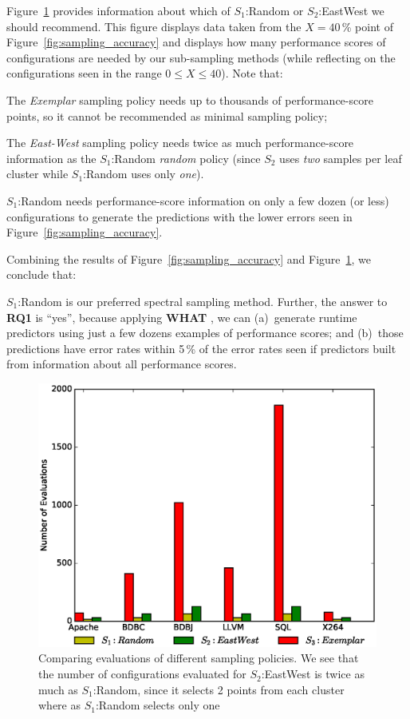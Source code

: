 \documentclass{newsig}
\newcommand{\fig}[1]{Figure~\ref{fig:#1}}
\newcommand{\what}{{\bf WHAT }}
\begin{document}
\fig{Evaluations} provides information about which  of    $S_1$:Random or $S_2$:EastWest we should recommend.
This figure displays data taken from the $X=40$\,\% point of \fig{sampling_accuracy} and displays
how many performance scores of configurations are needed by our sub-sampling methods (while
reflecting on the configurations seen in the range $0\le X \le 40$). Note that:
\begin{compactitem}
\item
The {\em Exemplar} sampling policy needs up to thousands of performance-score points, 
so it cannot be recommended as minimal sampling policy;
\item The {\em East-West} sampling policy needs twice as much performance-score information as 
the $S_1$:Random {\em random} policy (since $S_2$ uses {\em two} samples per leaf cluster  while
$S_1$:Random uses only {\em one}).
\item $S_1$:Random needs performance-score information on only a few dozen (or less) configurations to generate
the predictions with the lower errors seen in \fig{sampling_accuracy}.
\end{compactitem}
Combining the results of \fig{sampling_accuracy} and \fig{Evaluations}, we conclude that:

\begin{myshadowbox}
$S_1$:Random is our preferred spectral sampling method. Further,
the answer to {\bf RQ1} is ``yes'', because applying \what, we can (a)~generate runtime predictors
using just a few dozens examples of performance scores; and (b)~those predictions have error rates
within 5\,\% of the error rates seen if predictors built from information about all performance scores.
\end{myshadowbox}

\begin{figure}[!t]
\includegraphics[width=0.9\linewidth]{Figures/evaluation_graph.eps}
\caption{ Comparing evaluations of different sampling policies. We see that the number of configurations evaluated for $S_2$:EastWest is twice as much as $S_1$:Random, since it selects 2 points from each cluster where as  $S_1$:Random selects only one }\label{fig:Evaluations}
\end{figure}
\end{document}
